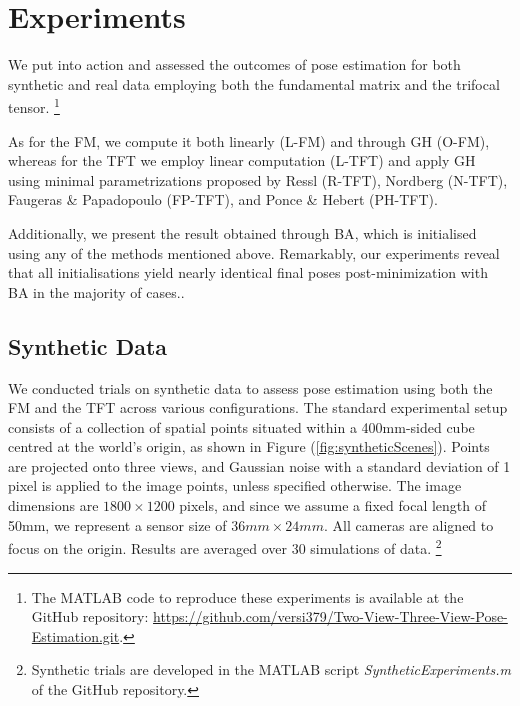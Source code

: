 \pagebreak

\section{Experiments}\label{sec:experiments}
We put into action and assessed the outcomes of pose estimation for both synthetic and real data employing both the fundamental matrix and the trifocal tensor. \footnote{The MATLAB code to reproduce these experiments is available at the GitHub repository: \href{https://github.com/versi379/Two-View-Three-View-Pose-Estimation.git}{https://github.com/versi379/Two-View-Three-View-Pose-Estimation.git}.}

As for the \acs{FM}, we compute it both linearly (\acs{L-FM}) and through \acs{GH} (\acs{O-FM}), whereas for the \acs{TFT} we employ linear computation (\acs{L-TFT}) and apply \acs{GH} using minimal parametrizations proposed by Ressl (\acs{R-TFT}), Nordberg (\acs{N-TFT}), Faugeras \& Papadopoulo (\acs{FP-TFT}), and Ponce \& Hebert (\acs{PH-TFT}).

Additionally, we present the result obtained through \acs{BA}, which is initialised using any of the methods mentioned above. Remarkably, our experiments reveal that all initialisations yield nearly identical final poses post-minimization with \acs{BA} in the majority of cases..

\subsection{Synthetic Data}
We conducted trials on synthetic data to assess pose estimation using both the \acs{FM} and the \acs{TFT} across various configurations. The standard experimental setup consists of a collection of spatial points situated within a 400mm-sided cube centred at the world's origin, as shown in Figure (\ref{fig:syntheticScenes}). Points are projected onto three views, and Gaussian noise with a standard deviation of 1 pixel is applied to the image points, unless specified otherwise. The image dimensions are \( 1800 \times 1200 \) pixels, and since we assume a fixed focal length of 50mm, we represent a sensor size of \( 36mm \times 24mm \). All cameras are aligned to focus on the origin. Results are averaged over 30 simulations of data. \footnote{Synthetic trials are developed in the MATLAB script \textit{SyntheticExperiments.m} of the GitHub repository.}\\

